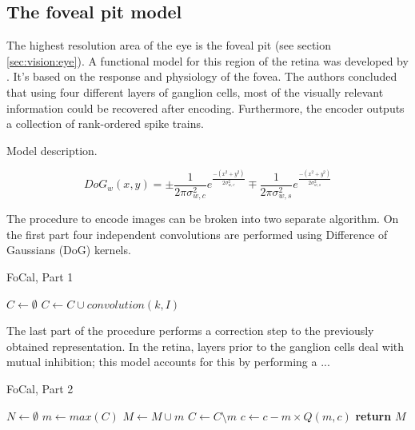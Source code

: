 \subsection{The foveal pit model}

The highest resolution area of the eye is the foveal pit (see section \ref{sec:vision:eye}). A functional model for this region of the retina was developed by \citeauthor{basab-model}\cite{basab-model}. It's based on the response and physiology of the fovea. The authors concluded that using four different layers of ganglion cells, most of the visually relevant information could be recovered after encoding. Furthermore, the encoder outputs a collection of rank-ordered spike trains. 

Model description.

\begin{equation}
\label{eq-dog}
DoG_w(x,y) = \pm\frac{1}{2\pi\sigma_{w,c}^2}e^{\frac{-(x^2 + y^2)}{2\sigma_{w,c}^2}}
\mp\frac{1}{2\pi\sigma_{w,s}^2}e^{\frac{-(x^2 + y^2)}{2\sigma_{w,s}^2}}
\end{equation}

The procedure to encode images can be broken into two separate algorithm. On the first part four independent convolutions are performed using Difference of Gaussians (DoG) kernels. 

\begin{algorithm}[h]
  \caption{FoCal, Part 1}
  \label{code-focal-conv}
  \begin{algorithmic}
    \State $C \leftarrow \emptyset$
    \State $C \leftarrow C \cup convolution(k, I)$
    \EndFor
    \EndProcedure
  \end{algorithmic}
\end{algorithm}

The last part of the procedure performs a correction step to the previously obtained representation. In the retina, layers prior to the ganglion cells deal with mutual inhibition; this model accounts for this by performing a ...

\begin{algorithm}[h]
  \caption{FoCal, Part 2}
  \label{code-focal-corr}
  \begin{algorithmic}
    \State $N \leftarrow \emptyset$ 
    \Repeat
    \State $m \leftarrow max(C)$
    \State $M \leftarrow M \cup m$
    \State $C \leftarrow C \setminus m$
     
     
    \State $c \leftarrow c - m \times Q(m, c)$
    \EndIf
    \EndFor
    \State \textbf{return} $M$
    \EndProcedure
  \end{algorithmic}
\end{algorithm}


